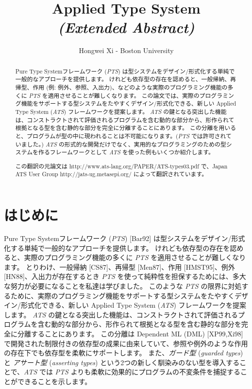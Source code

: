\documentclass[submit,techreq,noauthor,onecolumn]{ipsj}
\begin{document}
\title{Applied Type System \\ {\huge\it (Extended Abstract)}}

\author{Hongwei Xi - Boston University}{}{}

\begin{abstract}
Pure Type Systemフレームワーク ({\it PTS}) は型システムをデザイン/形式化する単純で一般的なアプローチを提供します。
けれども依存型の存在を認めると、一般帰納、再帰型、作用 (例: 例外、参照、入出力)、などのような実際のプログラミング機能の多くに {\it PTS} を適用させることが難しくなります。
この論文では、実際のプログラミング機能をサポートする型システムをたやすくデザイン/形式化できる、新しい Applied Type System ({\it ATS}) フレームワークを提案します。
{\it ATS} の鍵となる突出した機能は、コンストラクトされて評価されるプログラムを含む動的な部分から、形作られて根拠となる型を含む静的な部分を完全に分離することにあります。
この分離を用いると、プログラムが型の中に現われることは不可能になります。({\it PTS} では許可されていました。)
{\it ATS} の形式的な開発だけでなく、実用的なプログラミングのための型システムを作るフレームワークとして {\it ATS} を使った例もいくつか紹介します。

\vspace{5mm}

この翻訳の元論文は http://www.ats-lang.org/PAPER/ATS-types03.pdf で、Japan ATS User Group http://jats-ug.metasepi.org/ によって翻訳されています。
\end{abstract}

\maketitle
\thispagestyle{empty}

\section{はじめに}

Pure Type Systemフレームワーク ({\it PTS}) [Bar92] は型システムをデザイン/形式化する単純で一般的なアプローチを提供します。
けれども依存型の存在を認めると、実際のプログラミング機能の多くに {\it PTS} を適用させることが難しくなります。
とりわけ、一般帰納 [CS87]、再帰型 [Men87]、作用 [HMST95]、例外 [HN88]、入出力が存在するとき {\it PTS} を使って純粋性を担保するためには、多大な努力が必要になることを私達は学びました。
このような {\it PTS} の限界に対処するために、実際のプログラミング機能をサポートする型システムをたやすくデザイン/形式化できる、新しい Applied Type System ({\it ATS}) フレームワークを提案します。
{\it ATS} の鍵となる突出した機能は、コンストラクトされて評価されるプログラムを含む動的な部分から、形作られて根拠となる型を含む静的な部分を完全に分離することにあります。
この分離は Dependent ML (DML) [XP99,Xi98] で開発された制限付きの依存型の成果に由来していて、参照や例外のような作用の存在下でも依存型を柔軟にサポートします。
また、{\it ガード型} ({\it guarded types}) と {\it アサート型} ({\it asserting types}) という2つの新しく馴染みのない型を導入することで、{\it ATS} では {\it PTS} よりも柔軟に効果的にプログラムの不変条件を捕捉することができることを示します。
\end{document}
